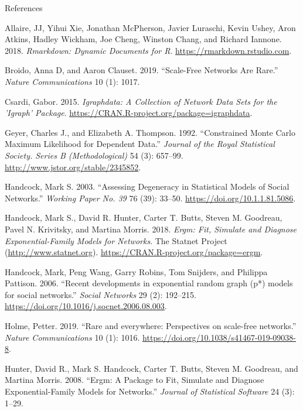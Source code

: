 \documentclass[10pt,ignorenonframetext,aspectratio=169,]{beamer}
\begin{document}
\begin{frame}[allowframebreaks]{References}
\protect\hypertarget{references}{}

\hypertarget{refs}{}
\leavevmode\hypertarget{ref-rmarkdown}{}%
Allaire, JJ, Yihui Xie, Jonathan McPherson, Javier Luraschi, Kevin
Ushey, Aron Atkins, Hadley Wickham, Joe Cheng, Winston Chang, and
Richard Iannone. 2018. \emph{Rmarkdown: Dynamic Documents for R}.
\url{https://rmarkdown.rstudio.com}.

\leavevmode\hypertarget{ref-broido2019}{}%
Broido, Anna D, and Aaron Clauset. 2019. ``Scale-Free Networks Are
Rare.'' \emph{Nature Communications} 10 (1): 1017.

\leavevmode\hypertarget{ref-Csardi2015}{}%
Csardi, Gabor. 2015. \emph{Igraphdata: A Collection of Network Data Sets
for the 'Igraph' Package}.
\url{https://CRAN.R-project.org/package=igraphdata}.

\leavevmode\hypertarget{ref-Geyer1992}{}%
Geyer, Charles J., and Elizabeth A. Thompson. 1992. ``Constrained Monte
Carlo Maximum Likelihood for Dependent Data.'' \emph{Journal of the
Royal Statistical Society. Series B (Methodological)} 54 (3): 657--99.
\url{http://www.jstor.org/stable/2345852}.

\leavevmode\hypertarget{ref-Handcock2003}{}%
Handcock, Mark S. 2003. ``Assessing Degeneracy in Statistical Models of
Social Networks.'' \emph{Working Paper No. 39} 76 (39): 33--50.
\url{https://doi.org/10.1.1.81.5086}.

\leavevmode\hypertarget{ref-Handcock2018}{}%
Handcock, Mark S., David R. Hunter, Carter T. Butts, Steven M. Goodreau,
Pavel N. Krivitsky, and Martina Morris. 2018. \emph{Ergm: Fit, Simulate
and Diagnose Exponential-Family Models for Networks}. The Statnet
Project (\url{http://www.statnet.org}).
\url{https://CRAN.R-project.org/package=ergm}.

\leavevmode\hypertarget{ref-Handcock2006}{}%
Handcock, Mark, Peng Wang, Garry Robins, Tom Snijders, and Philippa
Pattison. 2006. ``Recent developments in exponential random graph (p*)
models for social networks.'' \emph{Social Networks} 29 (2): 192--215.
\url{https://doi.org/10.1016/j.socnet.2006.08.003}.

\leavevmode\hypertarget{ref-Holme2019}{}%
Holme, Petter. 2019. ``Rare and everywhere: Perspectives on scale-free
networks.'' \emph{Nature Communications} 10 (1): 1016.
\url{https://doi.org/10.1038/s41467-019-09038-8}.

\leavevmode\hypertarget{ref-hunter2008}{}%
Hunter, David R., Mark S. Handcock, Carter T. Butts, Steven M. Goodreau,
and Martina Morris. 2008. ``Ergm: A Package to Fit, Simulate and
Diagnose Exponential-Family Models for Networks.'' \emph{Journal of
Statistical Software} 24 (3): 1--29.


\end{frame}
\end{document}
